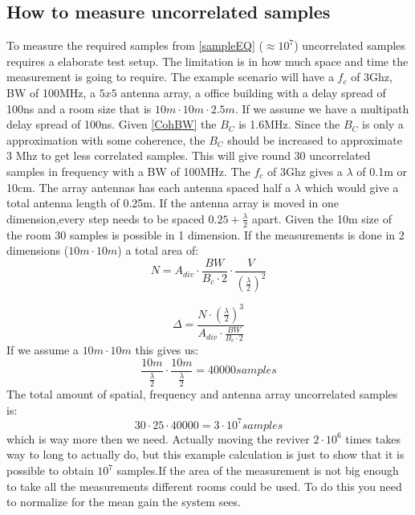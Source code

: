 \subsection{How to measure uncorrelated samples}
To measure the required samples from \autoref{sampleEQ} ($\approx 10^7$) uncorrelated samples requires a elaborate test setup. The limitation is in how much space and time the measurement is going to require. The example scenario  will have a $f_c$ of 3Ghz, BW of 100MHz, a $5x5$ antenna array, a office building with a delay spread of 100ns and a room size that is $10m \cdot 10m \cdot 2.5m$.
If we assume we have a multipath delay spread of 100ns. Given \autoref{CohBW} the $B_C$ is 1.6MHz. Since the $B_C$ is only a approximation with some coherence, the $B_C$ should be increased to approximate 3 Mhz to get less correlated samples. This will give round 30 uncorrelated samples in frequency with a BW of 100MHz.
The $f_c$ of 3Ghz gives a $\lambda$ of 0.1m or 10cm. The array antennas has each antenna spaced half a $\lambda$ which would give a total antenna length of 0.25m. If the antenna array is moved in one dimension,every step needs to be spaced $0.25+\frac{\lambda}{2}$ apart. Given the 10m size of the room 30 samples is possible in 1 dimension. If the measurements is done in 2 dimensions ($10m\cdot 10m$) a total area of:
\begin{equation}
N = A_{div} \cdot \frac{BW}{B_c \cdot 2} \cdot \frac{V}{(\frac{\lambda}{2})^2}
\label{howtosample}
\end{equation} 

\begin{equation}
\Delta = \frac{N\cdot (\frac{\lambda}{2})^3}{A_{div}\cdot \frac{BW}{B_c \cdot 2}}
\label{howtosqaure}
\end{equation}
If we assume a $10m \cdot 10m$ this gives us: 
\begin{equation}
\frac{10m}{\frac{\lambda}{2}} \cdot \frac{10m}{\frac{\lambda}{2}}  = 40000 samples
\end{equation}
The total amount of spatial, frequency and antenna array uncorrelated samples is:
\begin{equation}
30 \cdot 25 \cdot 40000 = 3 \cdot 10^7 samples
\end{equation}
which is way more then we need.
Actually moving the reviver $2 \cdot 10^6$ times takes way to long to actually do, but this example calculation is just to show that it is possible to obtain $10^7$ samples.If the area of the measurement is not big enough to take all the measurements different rooms could be used. To do this you need to normalize for the mean gain the system sees. 

